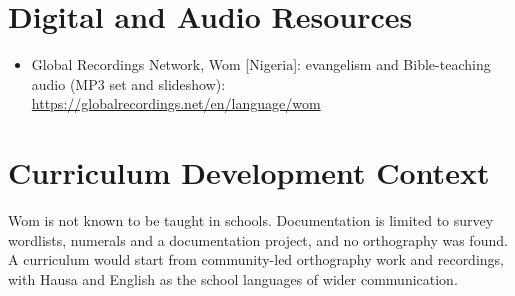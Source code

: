 \documentclass[12pt]{article}
\begin{document}
\section{Digital and Audio Resources}
\begin{itemize}
\item Global Recordings Network, Wom [Nigeria]: evangelism and Bible-teaching audio (MP3 set and slideshow): \url{https://globalrecordings.net/en/language/wom}
\end{itemize}

\section{Curriculum Development Context}
Wom is not known to be taught in schools. Documentation is limited to survey wordlists, numerals and a documentation project, and no orthography was found. A curriculum would start from community-led orthography work and recordings, with Hausa and English as the school languages of wider communication.
\end{document}
